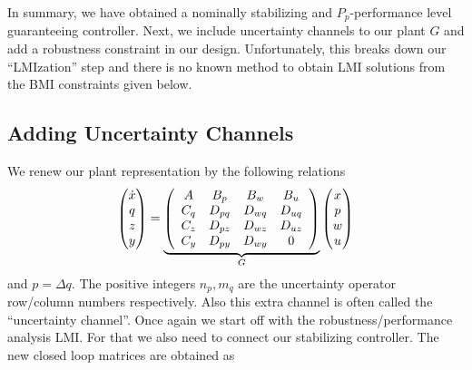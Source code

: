 In summary, we have obtained a nominally stabilizing and $P_p$-performance level guaranteeing controller. Next, we include 
uncertainty channels to our plant $G$ and add a robustness constraint in our design. Unfortunately, this breaks down our
\enquote{LMIzation} step and there is no known method to obtain LMI solutions from the BMI constraints given below.

\subsection{Adding Uncertainty Channels}
We renew our plant representation by the following relations
\begin{equation}
\begin{pmatrix}\dot{x}\\ q\\ z\\ y\end{pmatrix} = 
\underbrace{\left(
\begin{array}{cccc}
	A    &B_p    &B_w    &B_u\\
	C_q  &D_{pq} &D_{wq} &D_{uq}\\
	C_z  &D_{pz} &D_{wz} &D_{uz}\\
	C_y  &D_{py} &D_{wy} &0
\end{array}
\right)}_{G}
\begin{pmatrix}x\\ p\\ w\\ u\end{pmatrix}
\label{eq:genplant}
\end{equation}
and $p=\Delta q$. The positive integers $n_p,m_q$ are the uncertainty operator row/column numbers respectively. Also this extra
channel is often called the \enquote{uncertainty channel}. Once again we start off with the robustness/performance analysis LMI. 
For that we also need to connect our stabilizing controller. The new closed loop matrices are obtained as
